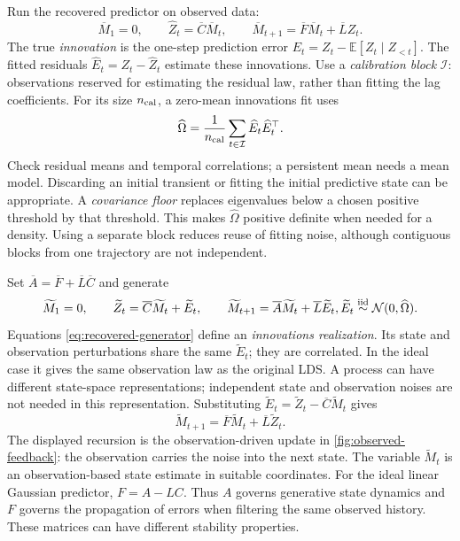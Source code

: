 \documentclass[11pt,twoside]{article}
\newcommand{\E}{\mathbb E}
\theoremstyle{definition}
\theoremstyle{remark}
\begin{document}
Run the recovered predictor on observed data:
\begin{equation}
 \overline M_1=0,\qquad
 \widehat Z_t=\overline C\overline M_t,\qquad
 \overline M_{t+1}=\overline F\overline M_t+\overline LZ_t.
 \label{eq:recovered-predictor}
\end{equation}
The true \emph{innovation} is the one-step prediction error
\(E_t=Z_t-\E[Z_t\mid Z_{<t}]\). The fitted residuals
\(\widehat E_t=Z_t-\widehat Z_t\) estimate these innovations.
Use a \emph{calibration block} \(\mathcal I\): observations reserved for
estimating the residual law, rather than fitting the lag coefficients.
For its size \(n_{\rm cal}\), a
zero-mean innovations fit uses
\begin{equation}
 \widehat\Omega=\frac1{n_{\rm cal}}\sum_{t\in\mathcal I}
 \widehat E_t\widehat E_t^\top .
 \label{eq:innovation-covariance}
\end{equation}
Check residual means and temporal correlations; a persistent mean needs
a mean model. Discarding an initial transient or fitting the initial
predictive state can be appropriate. A \emph{covariance floor} replaces
eigenvalues below a chosen positive threshold by that threshold. This makes
\(\widehat\Omega\) positive definite when needed for a density.
Using a separate block reduces reuse of fitting noise, although contiguous
blocks from one trajectory are not independent.

Set \(\overline A=\overline F+\overline L\overline C\) and generate
\begin{equation}
 \widetilde M_1=0,\qquad
 \widetilde Z_t=\overline C\widetilde M_t+\widetilde E_t,\qquad
 \widetilde M_{t+1}=\overline A\widetilde M_t+\overline L\widetilde E_t,
 \quad \widetilde E_t\stackrel{\rm iid}{\sim}
 \mathcal N(0,\widehat\Omega).
 \label{eq:recovered-generator}
\end{equation}
Equations \cref{eq:recovered-generator} define an \emph{innovations realization}.
Its state and observation
perturbations share the same \(\widetilde E_t\); they are correlated.
In the ideal case it gives the same observation law as the original LDS.
A process can have different state-space representations; independent
state and observation noises are not needed in this representation.
Substituting \(\widetilde E_t=\widetilde Z_t-\overline C\widetilde M_t\)
gives
\[
 \widetilde M_{t+1}
 =\overline F\widetilde M_t+\overline L\widetilde Z_t.
\]
The displayed recursion is the observation-driven update in \cref{fig:observed-feedback}:
the observation carries the noise into the next state.
The variable $\widetilde M_t$ is an observation-based state estimate in
suitable coordinates.
For the ideal linear Gaussian predictor, \(F=A-LC\).
Thus \(A\) governs generative state dynamics and \(F\) governs the
propagation of errors when filtering the same observed history. These
matrices can have different stability properties.
\end{document}
